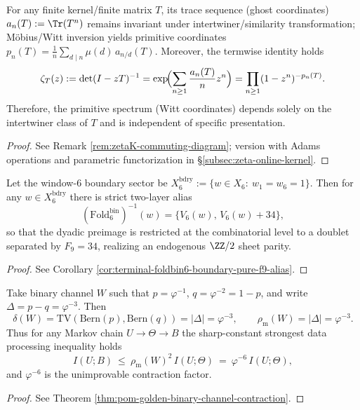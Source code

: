\begin{conclusion}[Strict commutativity and functoriality of Big-Witt/necklace bridge package: \texorpdfstring{$\zeta=\mathrm{Euler}\circ\mathrm{Mob}\circ\mathrm{TrSeq}$}{zeta=Euler o Mob o TrSeq}]\label{con:xi-terminal-big-witt-functoriality}
For any finite kernel/finite matrix \(T\), its trace sequence (ghost coordinates)
\(
a_n(T):=\Tr(T^n)
\)
remains invariant under intertwiner/similarity transformation; Möbius/Witt inversion yields primitive coordinates \(p_n(T)=\frac1n\sum_{d\mid n}\mu(d)\,a_{n/d}(T)\).
Moreover, the termwise identity holds
\[
\zeta_T(z):=\det(I-zT)^{-1}
=\exp\!\Bigl(\sum_{n\ge 1}\frac{a_n(T)}{n}z^n\Bigr)
=\prod_{n\ge 1}(1-z^n)^{-p_n(T)}.
\]
Therefore, the primitive spectrum (Witt coordinates) depends solely on the intertwiner class of \(T\) and is independent of specific presentation.
\end{conclusion}
\begin{proof}[Proof]
See Remark \ref{rem:zetaK-commuting-diagram}; version with Adams operations and parametric functorization in \S\ref{subsec:zeta-online-kernel}.
\end{proof}

\begin{conclusion}[Window-\(6\) boundary state \texorpdfstring{$\ZZ/2$}{Z/2} sheet parity: two-layer alias portal uniquely carried by \texorpdfstring{$F_9=34$}{F9=34}]\label{con:xi-terminal-window6-bdry-sheet-parity}
Let the window-\(6\) boundary sector be
\(
X^{\mathrm{bdry}}_6:=\{w\in X_6:\ w_1=w_6=1\}
\).
Then for any \(w\in X^{\mathrm{bdry}}_6\) there is strict two-layer alias
\[
(\mathrm{Fold}^{\mathrm{bin}}_6)^{-1}(w)=\{V_6(w),\,V_6(w)+34\},
\]
so that the dyadic preimage is restricted at the combinatorial level to a doublet separated by \(F_9=34\), realizing an endogenous \(\ZZ/2\) sheet parity.
\end{conclusion}
\begin{proof}[Proof]
See Corollary \ref{cor:terminal-foldbin6-boundary-pure-f9-alias}.
\end{proof}

\begin{conclusion}[Strongest data processing constant of golden complementary binary channel: \texorpdfstring{$\delta=\rho_{\mathrm{m}}=\varphi^{-3}$}{delta=rho_m=phi^-3} and \texorpdfstring{$I$}{I}-contraction \texorpdfstring{$\varphi^{-6}$}{phi^-6}]\label{con:xi-terminal-golden-binary-channel-sdpi}
Take binary channel \(W\) such that \(p=\varphi^{-1}\), \(q=\varphi^{-2}=1-p\), and write \(\Delta=p-q=\varphi^{-3}\).
Then
\[
\delta(W)=\mathrm{TV}(\mathrm{Bern}(p),\mathrm{Bern}(q))=|\Delta|=\varphi^{-3},
\qquad
\rho_{\mathrm{m}}(W)=|\Delta|=\varphi^{-3}.
\]
Thus for any Markov chain \(U\to \Theta\to B\) the sharp-constant strongest data processing inequality holds
\[
I(U;B)\ \le\ \rho_{\mathrm{m}}(W)^2\,I(U;\Theta)\ =\ \varphi^{-6}\,I(U;\Theta),
\]
and \(\varphi^{-6}\) is the unimprovable contraction factor.
\end{conclusion}
\begin{proof}[Proof]
See Theorem \ref{thm:pom-golden-binary-channel-contraction}.
\end{proof}

